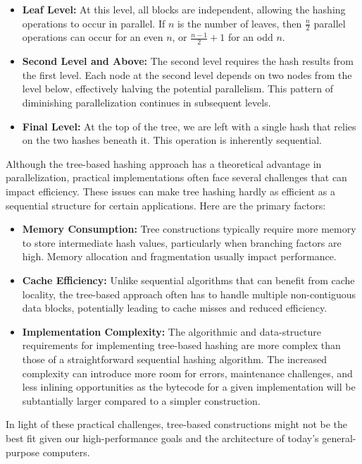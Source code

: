 \documentclass[10pt]{article}
\begin{document}
\begin{itemize}
\item \textbf{Leaf Level:} At this level, all blocks are independent, allowing the hashing operations to occur in parallel. If \( n \) is the number of leaves, then \( \frac{n}{2} \) parallel operations can occur for an even \( n \), or \( \frac{n-1}{2} + 1 \) for an odd \( n \).
\item \textbf{Second Level and Above:} The second level requires the hash results from the first level. Each node at the second level depends on two nodes from the level below, effectively halving the potential parallelism. This pattern of diminishing parallelization continues in subsequent levels.
\item \textbf{Final Level:} At the top of the tree, we are left with a single hash that relies on the two hashes beneath it. This operation is inherently sequential.
\end{itemize}

Although the tree-based hashing approach has a theoretical advantage in parallelization, practical implementations often face several challenges that can impact efficiency. These issues can make tree hashing hardly as efficient as a sequential structure for certain applications. Here are the primary factors:

\begin{itemize}
\item \textbf{Memory Consumption:} Tree constructions typically require more memory to store intermediate hash values, particularly when branching factors are high. Memory allocation and fragmentation usually impact performance.
\item \textbf{Cache Efficiency:} Unlike sequential algorithms that can benefit from cache locality, the tree-based approach often has to handle multiple non-contiguous data blocks, potentially leading to cache misses and reduced efficiency.
\item \textbf{Implementation Complexity:} The algorithmic and data-structure requirements for implementing tree-based hashing are more complex than those of a straightforward sequential hashing algorithm. The increased complexity can introduce more room for errors, maintenance challenges, and less inlining opportunities as the bytecode for a given implementation will be subtantially larger compared to a simpler construction.
\end{itemize}

In light of these practical challenges, tree-based constructions might not be the best fit given our high-performance goals and the architecture of today's general-purpose computers.
\end{document}
